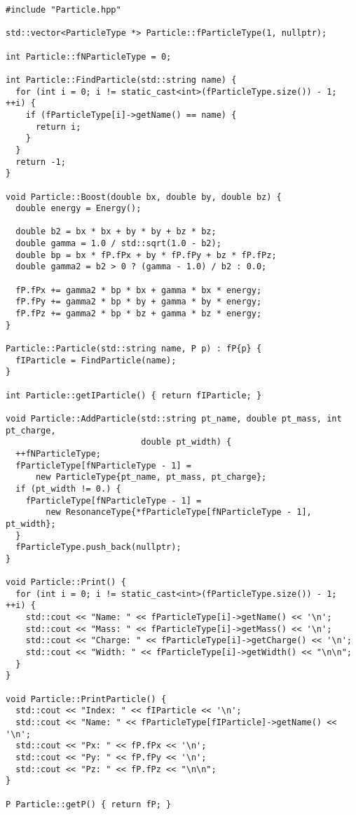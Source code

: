 \begin{lstlisting}
#include "Particle.hpp"

std::vector<ParticleType *> Particle::fParticleType(1, nullptr);

int Particle::fNParticleType = 0;

int Particle::FindParticle(std::string name) {
  for (int i = 0; i != static_cast<int>(fParticleType.size()) - 1; ++i) {
    if (fParticleType[i]->getName() == name) {
      return i;
    }
  }
  return -1;
}

void Particle::Boost(double bx, double by, double bz) {
  double energy = Energy();

  double b2 = bx * bx + by * by + bz * bz;
  double gamma = 1.0 / std::sqrt(1.0 - b2);
  double bp = bx * fP.fPx + by * fP.fPy + bz * fP.fPz;
  double gamma2 = b2 > 0 ? (gamma - 1.0) / b2 : 0.0;

  fP.fPx += gamma2 * bp * bx + gamma * bx * energy;
  fP.fPy += gamma2 * bp * by + gamma * by * energy;
  fP.fPz += gamma2 * bp * bz + gamma * bz * energy;
}

Particle::Particle(std::string name, P p) : fP{p} {
  fIParticle = FindParticle(name);
}

int Particle::getIParticle() { return fIParticle; }

void Particle::AddParticle(std::string pt_name, double pt_mass, int pt_charge,
                           double pt_width) {
  ++fNParticleType;
  fParticleType[fNParticleType - 1] =
      new ParticleType{pt_name, pt_mass, pt_charge};
  if (pt_width != 0.) {
    fParticleType[fNParticleType - 1] =
        new ResonanceType{*fParticleType[fNParticleType - 1], pt_width};
  }
  fParticleType.push_back(nullptr);
}

void Particle::Print() {
  for (int i = 0; i != static_cast<int>(fParticleType.size()) - 1; ++i) {
    std::cout << "Name: " << fParticleType[i]->getName() << '\n';
    std::cout << "Mass: " << fParticleType[i]->getMass() << '\n';
    std::cout << "Charge: " << fParticleType[i]->getCharge() << '\n';
    std::cout << "Width: " << fParticleType[i]->getWidth() << "\n\n";
  }
}

void Particle::PrintParticle() {
  std::cout << "Index: " << fIParticle << '\n';
  std::cout << "Name: " << fParticleType[fIParticle]->getName() << '\n';
  std::cout << "Px: " << fP.fPx << '\n';
  std::cout << "Py: " << fP.fPy << '\n';
  std::cout << "Pz: " << fP.fPz << "\n\n";
}

P Particle::getP() { return fP; }


\end{lstlisting}
